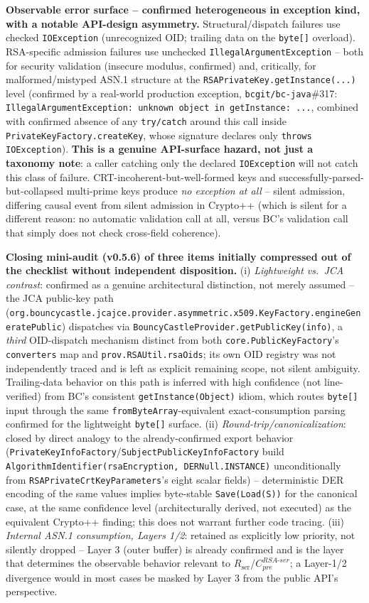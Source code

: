 \documentclass[11pt,a4paper]{article}
\begin{document}
\textbf{Observable error surface -- confirmed heterogeneous in exception kind, with a notable API-design asymmetry.} Structural/dispatch failures use checked \texttt{IOException} (unrecognized OID; trailing data on the \texttt{byte[]} overload). RSA-specific admission failures use unchecked \texttt{IllegalArgumentException} -- both for security validation (insecure modulus, confirmed) and, critically, for malformed/mistyped ASN.1 structure at the \texttt{RSAPrivateKey.getInstance(...)} level (confirmed by a real-world production exception, \texttt{bcgit/bc-java}\#317: \texttt{IllegalArgumentException: unknown object in getInstance: ...}, combined with confirmed absence of any \texttt{try/catch} around this call inside \texttt{PrivateKeyFactory.createKey}, whose signature declares only \texttt{throws IOException}). \textbf{This is a genuine API-surface hazard, not just a taxonomy note}: a caller catching only the declared \texttt{IOException} will not catch this class of failure. CRT-incoherent-but-well-formed keys and successfully-parsed-but-collapsed multi-prime keys produce \emph{no exception at all} -- silent admission, differing causal event from silent admission in Crypto++ (which is silent for a different reason: no automatic validation call at all, versus BC's validation call that simply does not check cross-field coherence).

\textbf{Closing mini-audit (v0.5.6) of three items initially compressed out of the checklist without independent disposition.} (i) \emph{Lightweight vs.\ JCA contrast}: confirmed as a genuine architectural distinction, not merely assumed -- the JCA public-key path (\texttt{org.bouncycastle.jcajce.provider.asymmetric.x509.KeyFactory.engineGeneratePublic}) dispatches via \texttt{BouncyCastleProvider.getPublicKey(info)}, a \emph{third} OID-dispatch mechanism distinct from both \texttt{core.PublicKeyFactory}'s \texttt{converters} map and \texttt{prov.RSAUtil.rsaOids}; its own OID registry was not independently traced and is left as explicit remaining scope, not silent ambiguity. Trailing-data behavior on this path is inferred with high confidence (not line-verified) from BC's consistent \texttt{getInstance(Object)} idiom, which routes \texttt{byte[]} input through the same \texttt{fromByteArray}-equivalent exact-consumption parsing confirmed for the lightweight \texttt{byte[]} surface. (ii) \emph{Round-trip/canonicalization}: closed by direct analogy to the already-confirmed export behavior (\texttt{PrivateKeyInfoFactory}/\texttt{SubjectPublicKeyInfoFactory} build \texttt{AlgorithmIdentifier(rsaEncryption, DERNull.INSTANCE)} unconditionally from \texttt{RSAPrivateCrtKeyParameters}'s eight scalar fields) -- deterministic DER encoding of the same values implies byte-stable \texttt{Save(Load(S))} for the canonical case, at the same confidence level (architecturally derived, not executed) as the equivalent Crypto++ finding; this does not warrant further code tracing. (iii) \emph{Internal ASN.1 consumption, Layers 1/2}: retained as explicitly low priority, not silently dropped -- Layer 3 (outer buffer) is already confirmed and is the layer that determines the observable behavior relevant to $R_{\text{ser}}$/$C_{pre}^{RSA\text{-}ser}$; a Layer-1/2 divergence would in most cases be masked by Layer 3 from the public API's perspective.
\end{document}

